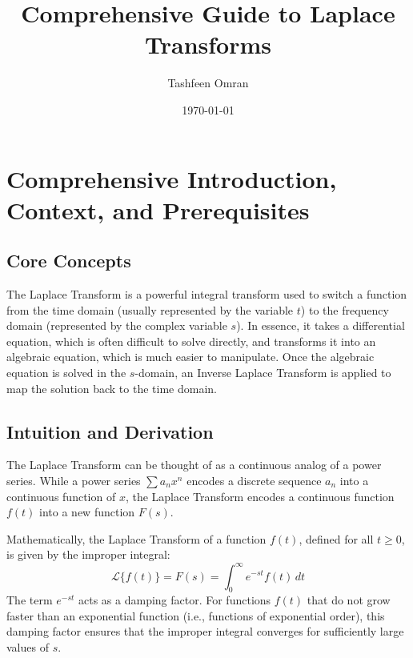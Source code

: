 \documentclass[11pt, a4paper]{article}
\title{Comprehensive Guide to Laplace Transforms}
\author{Tashfeen Omran}
\date{\today}
\theoremstyle{definition}
\theoremstyle{remark}
\begin{document}
\maketitle
\tableofcontents
\newpage

\section{Comprehensive Introduction, Context, and Prerequisites}

\subsection{Core Concepts}
The Laplace Transform is a powerful integral transform used to switch a function from the time domain (usually represented by the variable $t$) to the frequency domain (represented by the complex variable $s$). In essence, it takes a differential equation, which is often difficult to solve directly, and transforms it into an algebraic equation, which is much easier to manipulate. Once the algebraic equation is solved in the $s$-domain, an Inverse Laplace Transform is applied to map the solution back to the time domain.

\subsection{Intuition and Derivation}
The Laplace Transform can be thought of as a continuous analog of a power series. While a power series $\sum a_n x^n$ encodes a discrete sequence $a_n$ into a continuous function of $x$, the Laplace Transform encodes a continuous function $f(t)$ into a new function $F(s)$. 

Mathematically, the Laplace Transform of a function $f(t)$, defined for all $t \ge 0$, is given by the improper integral:
\[
\mathscr{L}\{f(t)\} = F(s) = \int_0^\infty e^{-st} f(t) \, dt
\]
The term $e^{-st}$ acts as a damping factor. For functions $f(t)$ that do not grow faster than an exponential function (i.e., functions of exponential order), this damping factor ensures that the improper integral converges for sufficiently large values of $s$.
\end{document}

